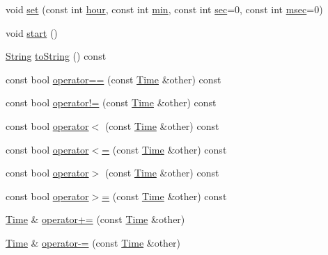 \begin{DoxyCompactItemize}
void \hyperlink{classprism_1_1_time_a7c67248f8370374686d1a61716b17485}{set} (const int \hyperlink{classprism_1_1_time_a380242e03982df8bf4af3eaa2296c808}{hour}, const int \hyperlink{classprism_1_1_time_afd27e4b1e093fed8253b10090c6090aa}{min}, const int \hyperlink{classprism_1_1_time_a83f655a9c7f1a2e8521ddcb395fa3796}{sec}=0, const int \hyperlink{classprism_1_1_time_a203ccb36ae3f75991b641e282350b280}{msec}=0)
\item 
void \hyperlink{classprism_1_1_time_a504e84942a112509c43c0c09d0441c0c}{start} ()
\item 
\hyperlink{classprism_1_1_string}{String} \hyperlink{classprism_1_1_time_a1bb4fbb063aff43d3640334baaea281d}{to\+String} () const 
\item 
const bool \hyperlink{classprism_1_1_time_a83609d958807bf8256c39881db7002a5}{operator==} (const \hyperlink{classprism_1_1_time}{Time} \&other) const 
\item 
const bool \hyperlink{classprism_1_1_time_aa2aba406dd4de48f602126c0b46a957a}{operator!=} (const \hyperlink{classprism_1_1_time}{Time} \&other) const 
\item 
const bool \hyperlink{classprism_1_1_time_a10289f95ed3569a03cea9ae793dc9a63}{operator$<$} (const \hyperlink{classprism_1_1_time}{Time} \&other) const 
\item 
const bool \hyperlink{classprism_1_1_time_a30638c4a54601a0d7d52b9249060fe6f}{operator$<$=} (const \hyperlink{classprism_1_1_time}{Time} \&other) const 
\item 
const bool \hyperlink{classprism_1_1_time_a4418d7b5578e62a27798cd1df1ddfd3f}{operator$>$} (const \hyperlink{classprism_1_1_time}{Time} \&other) const 
\item 
const bool \hyperlink{classprism_1_1_time_aedf46b0ebca56e0fc141dd07f98c5022}{operator$>$=} (const \hyperlink{classprism_1_1_time}{Time} \&other) const 
\item 
\hyperlink{classprism_1_1_time}{Time} \& \hyperlink{classprism_1_1_time_a40970b7d1556a7141fceb258880e807d}{operator+=} (const \hyperlink{classprism_1_1_time}{Time} \&other)
\item 
\hyperlink{classprism_1_1_time}{Time} \& \hyperlink{classprism_1_1_time_a59c80c6ffe492f6e54075164eb29afa3}{operator-\/=} (const \hyperlink{classprism_1_1_time}{Time} \&other)
\end{DoxyCompactItemize}
